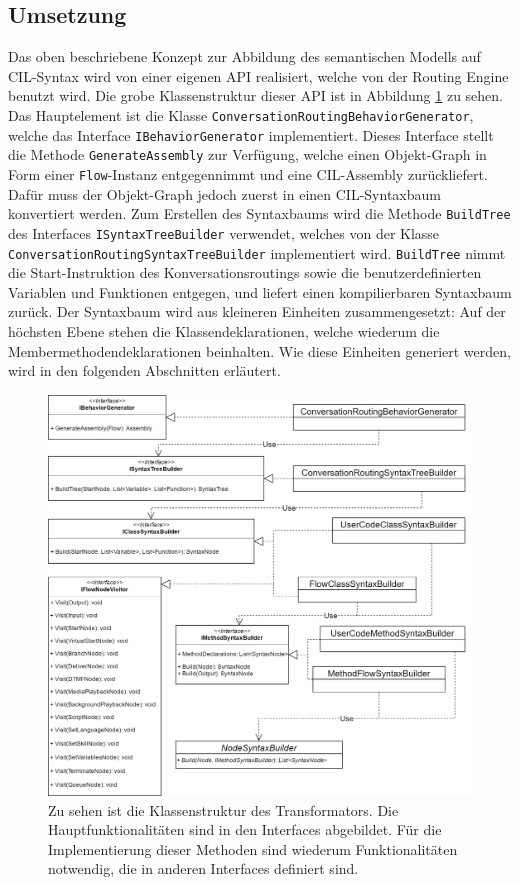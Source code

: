 \subsection{Umsetzung}
Das oben beschriebene Konzept zur Abbildung des semantischen Modells auf CIL-Syntax wird von einer eigenen API realisiert, welche von der Routing Engine benutzt wird. Die grobe Klassenstruktur dieser API ist in Abbildung \ref{fig:UML:Transformator} zu sehen. Das Hauptelement ist die Klasse \texttt{ConversationRoutingBehaviorGenerator}, welche das Interface \texttt{IBehaviorGenerator} implementiert. Dieses Interface stellt die Methode \texttt{GenerateAssembly} zur Verfügung, welche einen Objekt-Graph in Form einer \texttt{Flow}-Instanz entgegennimmt und eine CIL-Assembly zurückliefert.  Dafür muss der Objekt-Graph jedoch zuerst in einen CIL-Syntaxbaum konvertiert werden. Zum Erstellen des Syntaxbaums wird die Methode \texttt{BuildTree} des Interfaces \texttt{ISyntaxTreeBuilder} verwendet, welches von der Klasse \texttt{Con\-ver\-sa\-tion\-Rou\-ting\-Syn\-tax\-Tree\-Buil\-der} implementiert wird. \texttt{BuildTree} nimmt die Start-Instruktion des Konversationsroutings sowie die benutzerdefinierten Variablen und Funktionen entgegen, und liefert einen kompilierbaren Syntaxbaum zurück. Der Syntaxbaum wird aus kleineren Einheiten zusammengesetzt: Auf der höchsten Ebene stehen die Klassendeklarationen, welche wiederum die Membermethodendeklarationen beinhalten. Wie diese Einheiten generiert werden, wird in den folgenden Abschnitten erläutert.

\begin{figure} %
	\centering
		\includegraphics[width=\textwidth]{img/TransformatorUML.png}
	\caption[Klassenstruktur des Transformators]{Zu sehen ist die Klassenstruktur des Transformators. Die Hauptfunktionalitäten sind in den Interfaces abgebildet. Für die Implementierung dieser Methoden sind wiederum Funktionalitäten notwendig, die in anderen Interfaces definiert sind.}
	\label{fig:UML:Transformator}
\end{figure}
 

